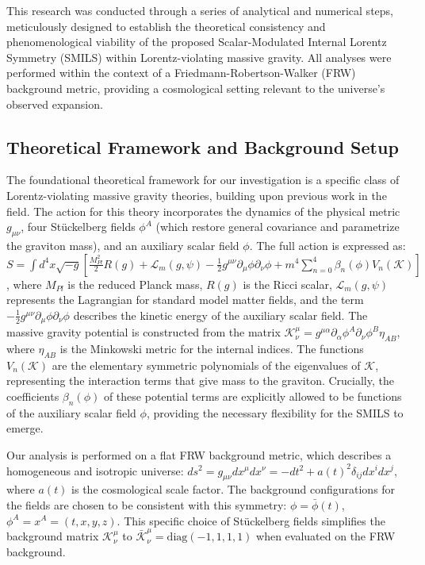 \documentclass[twocolumn]{aastex631}
\begin{document}
This research was conducted through a series of analytical and numerical steps, meticulously designed to establish the theoretical consistency and phenomenological viability of the proposed Scalar-Modulated Internal Lorentz Symmetry (SMILS) within Lorentz-violating massive gravity. All analyses were performed within the context of a Friedmann-Robertson-Walker (FRW) background metric, providing a cosmological setting relevant to the universe's observed expansion.

\subsection{Theoretical Framework and Background Setup}
The foundational theoretical framework for our investigation is a specific class of Lorentz-violating massive gravity theories, building upon previous work in the field. The action for this theory incorporates the dynamics of the physical metric $g_{\mu\nu}$, four Stückelberg fields $\phi^A$ (which restore general covariance and parametrize the graviton mass), and an auxiliary scalar field $\phi$. The full action is expressed as:
$S = \int d^4x \sqrt{-g} \left[ \frac{M_{Pl}^2}{2} R(g) + \mathcal{L}_m(g, \psi) - \frac{1}{2}g^{\mu\nu}\partial_\mu\phi\partial_\nu\phi + m^4 \sum_{n=0}^4 \beta_n(\phi) V_n(\mathcal{K}) \right]$,
where $M_{Pl}$ is the reduced Planck mass, $R(g)$ is the Ricci scalar, $\mathcal{L}_m(g, \psi)$ represents the Lagrangian for standard model matter fields, and the term $-\frac{1}{2}g^{\mu\nu}\partial_\mu\phi\partial_\nu\phi$ describes the kinetic energy of the auxiliary scalar field. The massive gravity potential is constructed from the matrix $\mathcal{K}^\mu_\nu = g^{\mu\alpha} \partial_\alpha \phi^A \partial_\nu \phi^B \eta_{AB}$, where $\eta_{AB}$ is the Minkowski metric for the internal indices. The functions $V_n(\mathcal{K})$ are the elementary symmetric polynomials of the eigenvalues of $\mathcal{K}$, representing the interaction terms that give mass to the graviton. Crucially, the coefficients $\beta_n(\phi)$ of these potential terms are explicitly allowed to be functions of the auxiliary scalar field $\phi$, providing the necessary flexibility for the SMILS to emerge.

Our analysis is performed on a flat FRW background metric, which describes a homogeneous and isotropic universe:
$ds^2 = g_{\mu\nu}dx^\mu dx^\nu = -dt^2 + a(t)^2 \delta_{ij} dx^i dx^j$,
where $a(t)$ is the cosmological scale factor. The background configurations for the fields are chosen to be consistent with this symmetry:
$\phi = \bar{\phi}(t)$,
$\phi^A = x^A = (t, x, y, z)$.
This specific choice of Stückelberg fields simplifies the background matrix $\mathcal{K}^\mu_\nu$ to $\bar{\mathcal{K}}^\mu_\nu = \text{diag}(-1, 1, 1, 1)$ when evaluated on the FRW background.
\end{document}
